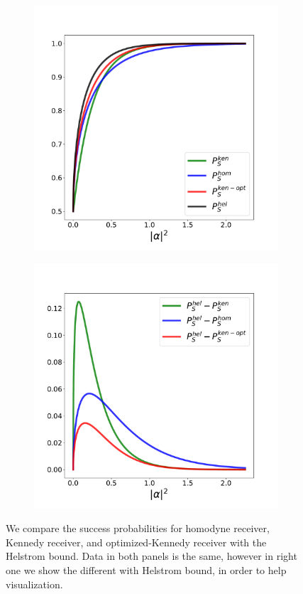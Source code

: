 \begin{figure}[t!]
\centering
    \begin{subfigure}[b]{0.49\textwidth}
        \centering
        \includegraphics[width=1.\textwidth]{Figures/312/kennedy_compa.pdf}
    \end{subfigure}
    \hfill
    \begin{subfigure}[b]{0.49\textwidth}
        \centering
        \includegraphics[width=1.\textwidth]{Figures/312/kennedy_compa_diff_hel.pdf}
    \end{subfigure}
\caption{We compare the success probabilities for homodyne receiver, Kennedy receiver, and optimized-Kennedy receiver with the Helstrom bound. Data in both panels is the same, however in right one we show the different with Helstrom bound, in order to help visualization.}
\label{fig:kenn_compa1}
\end{figure}

